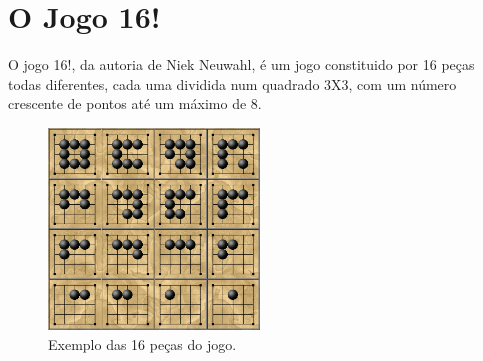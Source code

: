 \documentclass[a4paper]{article}
\begin{document}

\newpage

%
%
%
%
%
%
%


\section{O Jogo 16!}

O jogo 16!, da autoria de Niek Neuwahl, é um jogo constituido por 16 peças todas diferentes, cada uma dividida num quadrado 3X3, com um número crescente de pontos até um máximo de 8.

\begin{figure}[h!]
  \centering
      \includegraphics[width=0.5\textwidth]{Pieces}
  \caption{Exemplo das 16 peças do jogo.}
\end{figure}
\end{document}
